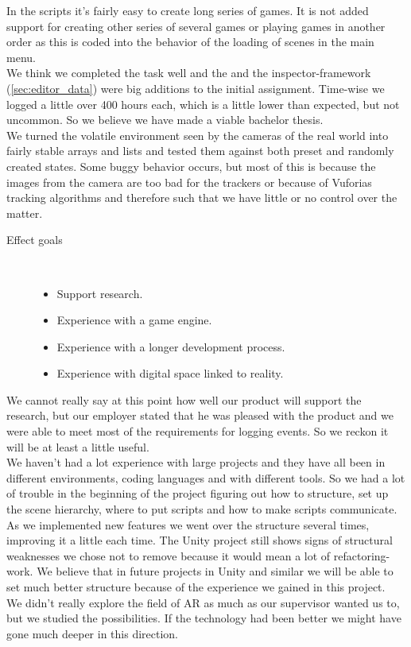 In the scripts it's fairly easy to create long series of games. 
It is not added support for creating other series of several games or playing games in another order as this is coded into the behavior of the loading of scenes in the main menu.\\
We think we completed the task well and the  and the inspector-framework (\ref{sec:editor_data}) were big additions to the initial assignment. Time-wise we logged a little over 400 hours each, which is a little lower than expected, but not uncommon. So we believe we have made a viable bachelor thesis.\\
We turned the volatile environment seen by the cameras of the real world
into fairly stable arrays and lists and tested them against both preset 
and randomly created states. Some buggy behavior occurs, but most of this
is because the images from the camera are too bad for the trackers or because
of Vuforias tracking algorithms and therefore such that we have little or no control over the matter.\\

\begin{description}
	\item[Effect goals]\ 
	\begin{itemize}
		\item Support research.
		\item Experience with a game engine.
		\item Experience with a longer development process.
		\item Experience with digital space linked to reality.
	\end{itemize}
\end{description}
We cannot really say at this point how well our product will support the research, but our employer stated that he was pleased with the product and we were able to meet most of the requirements for logging events. 
So we reckon it will be at least a little useful.\\
We haven't had a lot experience with large projects and they have all been in different environments, coding languages and with different tools. 
So we had a lot of trouble in the beginning of the project figuring out how to structure, set up the scene hierarchy, where to put scripts and how to make scripts communicate.
As we implemented new features we went over the structure several times, improving it a little each time. 
The Unity project still shows signs of structural weaknesses we chose not to remove because it would mean a lot of refactoring-work. 
We believe that in future projects in Unity and similar we will be able to set much better structure because of the experience we gained in this project.\\
We didn't really explore the field of AR as much as our supervisor wanted us to, but we studied the possibilities. 
If the technology had been better we might have gone much deeper in this direction.


